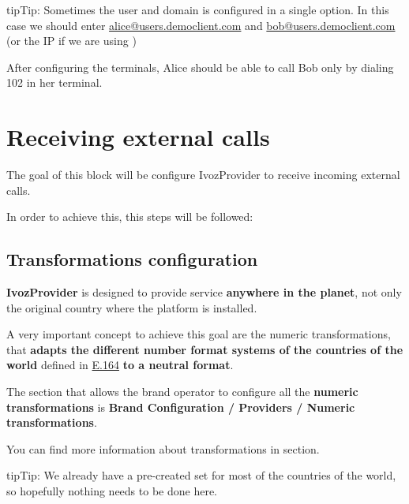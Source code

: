 \documentclass[letterpaper,10pt,english]{sphinxmanual}
\begin{document}
\begin{notice}{tip}{Tip:}
Sometimes the user and domain is configured in a single option. In this
case we should enter \href{mailto:alice@users.democlient.com}{alice@users.democlient.com} and \href{mailto:bob@users.democlient.com}{bob@users.democlient.com}
(or the IP if we are using {\hyperref[getting_started/internal_calls/brand_portal:dnshack]{}})
\end{notice}

After configuring the terminals, Alice should be able to call Bob only by
dialing 102 in her terminal.


\chapter{Receiving external calls}
\label{getting_started/external_incoming_calls/index::doc}\label{getting_started/external_incoming_calls/index:receiving-external-calls}
The goal of this block will be configure IvozProvider to receive incoming
external calls.

In order to achieve this, this steps will be followed:


\section{Transformations configuration}
\label{getting_started/external_incoming_calls/transformations:transformations-configuration}\label{getting_started/external_incoming_calls/transformations::doc}
\textbf{IvozProvider} is designed to provide service \textbf{anywhere in the planet}, not
only the original country where the platform is installed.

A very important concept to achieve this goal are the numeric transformations,
that \textbf{adapts the different number format systems of the countries of the world}
defined in \href{https://www.itu.int/rec/T-REC-E.164/es}{E.164} \textbf{to a neutral
format}.

The section that allows the brand operator to configure all the \textbf{numeric
transformations} is \textbf{Brand Configuration / Providers / Numeric transformations}.

You can find more information about transformations in {\hyperref[administration_portal/brand/settings/numeric_transformations:numeric\string-transformations]{}} section.

\begin{notice}{tip}{Tip:}
We already have a pre-created set for most of the countries of the world, so hopefully nothing needs to be done here.
\end{notice}
\end{document}
